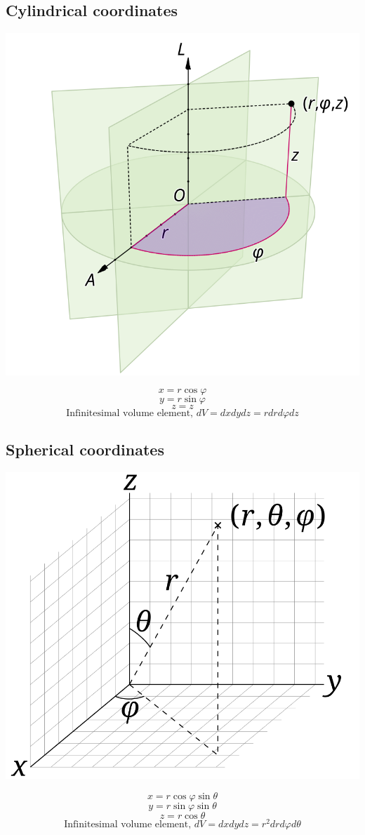 \documentclass[11pt]{article}
\begin{document}
\subsection{Cylindrical coordinates}
\label{sec:org9f0c36a}
\begin{center}
\includegraphics[width=.9\linewidth]{./images/cylindrical-coordinates.png}
\end{center}
\[x = r \cos \varphi\]
\[y = r \sin \varphi\]
\[z = z\]
\[\text{Infinitesimal volume element, } dV = dx dy dz = r dr d \varphi dz\]

\subsection{Spherical coordinates}
\label{sec:org0ab190d}
\begin{center}
\includegraphics[width=.9\linewidth]{./images/spherical-coordinates.png}
\end{center}
\[x = r \cos \varphi \sin \theta\]
\[y = r \sin \varphi \sin \theta\]
\[z = r \cos \theta\]
\[\text{Infinitesimal volume element, } dV = dx dy dz = r^2 dr d \varphi d \theta\]
\end{document}
